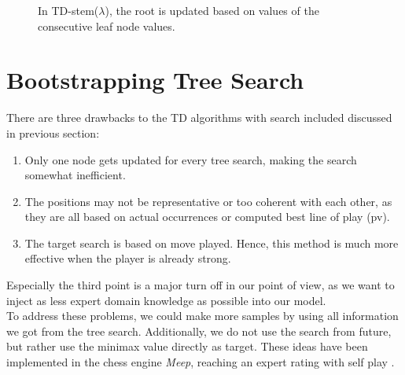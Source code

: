 \begin{figure}
\centering
{}
\caption[TD-stem($\lambda$)]{In TD-stem($\lambda$), the root is updated based on values of the consecutive leaf node values.}
\label{fig:tdrootleaf}
\end{figure}

\section{Bootstrapping Tree Search}
\label{sec:bts}
There are three drawbacks to the TD algorithms with search included discussed in previous section:
\begin{enumerate}
\item Only one node gets updated for every tree search, making the search somewhat inefficient.
\item The positions may not be representative or too coherent with each other, as they are all based on actual occurrences or computed best line of play (\gls{pv}).
\item The target search is based on move played. Hence, this method is much more effective when the player is already strong.
\end{enumerate}
Especially the third point is a major turn off in our point of view, as we want to inject as less expert domain knowledge as possible into our model.\\
To address these problems, we could make more samples by using all information we got from the tree search. Additionally, we do not use the search from future, but rather use the minimax value directly as target. These ideas have been implemented in the chess engine \textit{Meep}, reaching an expert rating with self play \cite{veness09}.

